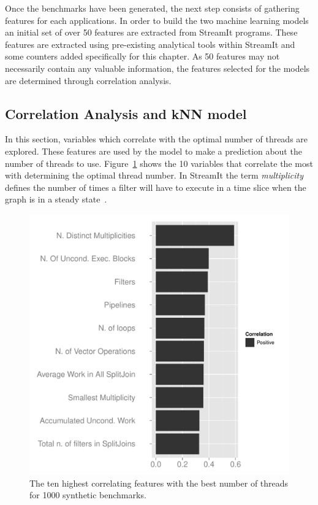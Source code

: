 Once the benchmarks have been generated, the next step consists of gathering features for each applications.
In order to build the two machine learning models an initial set of over 50 features are extracted from StreamIt programs.
These features are extracted using pre-existing analytical tools within StreamIt and some counters added specifically for this chapter.
As 50 features may not necessarily contain any valuable information, the features selected for the models are determined through correlation analysis.

\subsection{Correlation Analysis and kNN model}
In this section, variables which correlate with the optimal number of threads are explored.
These features are used by the model to make a prediction about the number of threads to use.
Figure~\ref{fig:corr} shows the 10 variables that correlate the most with determining the optimal thread number.
In StreamIt the term \textit{multiplicity} defines the number of times a filter will have to execute in a time slice when the graph is in a steady state~\cite{gordon2002streamcomp}.

\begin{figure}
  \includegraphics[width=1\textwidth]{streamit-paper/graphics/corrGraph.pdf}
  \caption{The ten highest correlating features with the best number of threads for 1000 synthetic benchmarks.}\label{fig:corr}
\end{figure}
 
